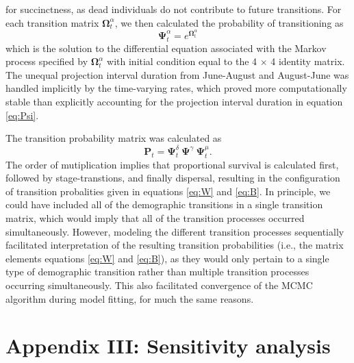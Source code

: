 \documentclass[11pt]{article}
\begin{document}
for succinctness, as dead individuals do not contribute to future transitions.
For each transition matrix $\boldsymbol\Omega^{\alpha}_t$, 
we then calculated the probability of transitioning as
%
\begin{equation} \label{eq:Psi}
\boldsymbol\Psi^{\alpha}_t = e^{\boldsymbol\Omega^{\alpha}_t}
\end{equation}
%
which is the solution to the differential equation associated with the Markov process
specified by $\boldsymbol\Omega^{\alpha}_t$ 
with initial condition equal to the 4 $\times$ 4 identity matrix.
The unequal projection interval duration from June-August and August-June was handled 
implicitly by the time-varying rates, 
which proved more computationally stable than explicitly accounting for the projection
interval duration in equation \ref{eq:Psi}.

The transition probability matrix was calculated as 
\begin{equation} \label{eq:POmega}
\mathbf{P}_{t} = \boldsymbol\Psi^{\delta}_t~\boldsymbol\Psi^{\gamma}~\boldsymbol\Psi^{\mu}_t.
\end{equation}
%
The order of mutiplication implies that proportional survival is calculated first,
followed by stage-transtions, and finally dispersal,
resulting in the configuration of transition probalities
given in equations \ref{eq:W} and \ref{eq:B}.
In principle, we could have included all of the demographic transitions in a single
transition matrix,
which would imply that all of the transition processes occurred simultaneously. 
However, modeling the different transition processes sequentially facilitated interpretation
of the resulting transition probabilities 
(i.e., the matrix elements equations \ref{eq:W} and \ref{eq:B}), 
as they would only pertain to a single type of demographic transition
rather than multiple transition processes occurring simultaneously.
This also facilitated convergence of the MCMC algorithm during model fitting, 
for much the same reasons.




\section*{Appendix III: Sensitivity analysis} 
\end{document}
